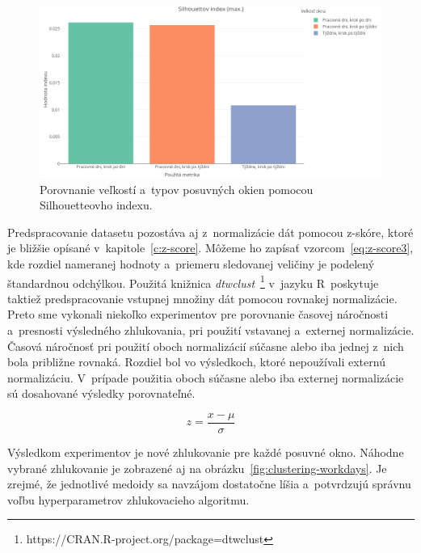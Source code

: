 \documentclass[a4paper,twoside,slovak,12pt,appendix]{article}
\begin{document}
\begin{figure}[htbp]
  \centering
  \includegraphics[width=\textwidth]{cvi/window_comparison/201903072017-Sil-window_comparison.png}
  \caption{Porovnanie veľkostí a~typov posuvných okien pomocou Silhouetteovho indexu.}
	\label{fig:cvi-window-sil}
\end{figure}

\noindent
Predspracovanie datasetu pozostáva aj z~normalizácie dát pomocou z-skóre, ktoré
je bližšie opísané v~kapitole~\ref{c:z-score}. Môžeme ho zapísať
vzorcom~\ref{eq:z-score3}, kde rozdiel nameranej hodnoty a~priemeru sledovanej
veličiny je podelený štandardnou odchýlkou. Použitá knižnica
\textit{dtwclust}~\footnote{https://CRAN.R-project.org/package=dtwclust}
v~jazyku R~poskytuje taktiež predspracovanie vstupnej množiny dát pomocou
rovnakej normalizácie. Preto sme vykonali niekoľko experimentov pre porovnanie
časovej náročnosti a~presnosti výsledného zhlukovania, pri použití vstavanej
a~externej normalizácie. Časová náročnosť pri použití oboch normalizácií súčasne
alebo iba jednej z~nich bola približne rovnaká. Rozdiel bol vo výsledkoch, ktoré
nepoužívali externú normalizáciu. V~prípade použitia oboch súčasne alebo iba
externej normalizácie sú dosahované výsledky porovnateľné.

\begin{equation}
	\label{eq:z-score3}
  z = \frac{x-\mu}{\sigma}
\end{equation}

\noindent
Výsledkom experimentov je nové zhlukovanie pre každé posuvné okno. Náhodne
vybrané zhlukovanie je zobrazené aj na obrázku~\ref{fig:clustering-workdays}.
Je zrejmé, že jednotlivé medoidy sa navzájom dostatočne líšia a~potvrdzujú
správnu voľbu hyperparametrov zhlukovacieho algoritmu.
\end{document}
